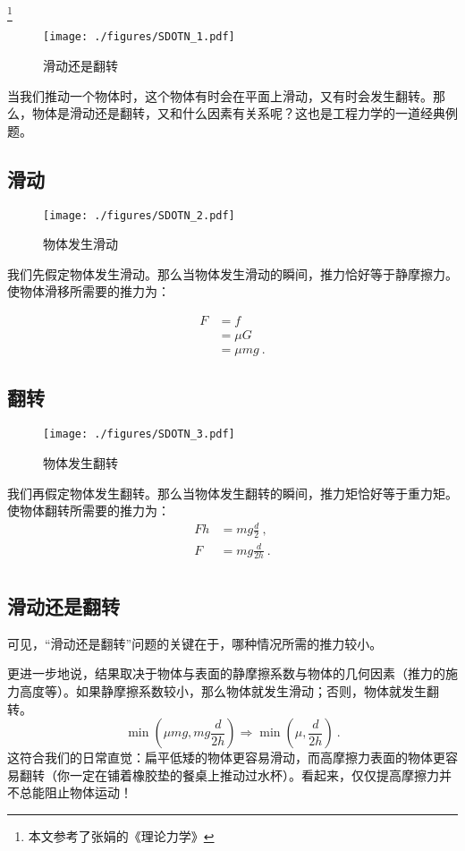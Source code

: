 
\begin{issues}
\issueMissDepend
\end{issues}

\footnote{本文参考了张娟的《理论力学》}

\begin{figure}[ht]
\centering
\texttt{[image: ./figures/SDOTN\_1.pdf]}
\caption{滑动还是翻转} \label{SDOTN_fig1}
\end{figure}

当我们推动一个物体时，这个物体有时会在平面上滑动，又有时会发生翻转。那么，物体是滑动还是翻转，又和什么因素有关系呢？这也是工程力学的一道经典例题。

\subsection{滑动}
\begin{figure}[ht]
\centering
\texttt{[image: ./figures/SDOTN\_2.pdf]}
\caption{物体发生滑动} \label{SDOTN_fig2}
\end{figure}
我们先假定物体发生滑动。那么当物体发生滑动的瞬间，推力恰好等于静摩擦力。使物体滑移所需要的推力为：

\begin{equation}
\begin{aligned}
F&=f\\
&=\mu G\\
&=\mu mg~.
\end{aligned}
\end{equation}

\subsection{翻转}
\begin{figure}[ht]
\centering
\texttt{[image: ./figures/SDOTN\_3.pdf]}
\caption{物体发生翻转} \label{SDOTN_fig3}
\end{figure}
我们再假定物体发生翻转。那么当物体发生翻转的瞬间，推力矩恰好等于重力矩。使物体翻转所需要的推力为：
\begin{equation}
\begin{aligned}
Fh&=mg \frac{d}{2}~,\\
F&=mg \frac{d}{2h}~.\\
\end{aligned}
\end{equation}

\subsection{滑动还是翻转}
可见，“滑动还是翻转”问题的关键在于，哪种情况所需的推力较小。

更进一步地说，结果取决于物体与表面的静摩擦系数与物体的几何因素（推力的施力高度等）。如果静摩擦系数较小，那么物体就发生滑动；否则，物体就发生翻转。
\begin{equation}
\min(\mu mg, mg \frac{d}{2h})\Rightarrow
\min(\mu, \frac{d}{2h})~.
\end{equation}
这符合我们的日常直觉：扁平低矮的物体更容易滑动，而高摩擦力表面的物体更容易翻转（你一定在铺着橡胶垫的餐桌上推动过水杯）。看起来，仅仅提高摩擦力并不总能阻止物体运动！

